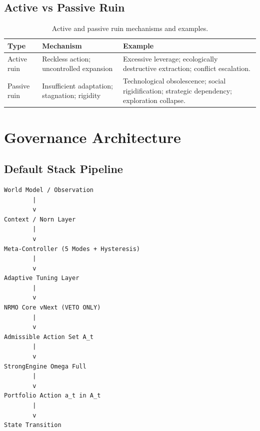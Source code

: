 \subsection{Active vs Passive Ruin}
\label{sec:omega-active-passive-table}

\begin{table}[ht]
\centering
\small
\begin{tabularx}{\linewidth}{lXX}
\toprule
\textbf{Type} & \textbf{Mechanism} & \textbf{Example} \\
\midrule
Active ruin
& Reckless action; uncontrolled expansion
& Excessive leverage; ecologically destructive extraction; conflict
escalation. \\

Passive ruin
& Insufficient adaptation; stagnation; rigidity
& Technological obsolescence; social rigidification; strategic
dependency; exploration collapse. \\

\bottomrule
\end{tabularx}
\caption[Active vs passive ruin]{Active and passive ruin mechanisms
and examples.}
\label{tab:omega-active-passive}
\end{table}

\section{Governance Architecture}
\label{sec:omega-governance-arch}


\subsection{Default Stack Pipeline}
\label{sec:omega-default-stack}

\begin{lstlisting}[basicstyle=\ttfamily\scriptsize,frame=single]
World Model / Observation
        |
        v
Context / Norn Layer
        |
        v
Meta-Controller (5 Modes + Hysteresis)
        |
        v
Adaptive Tuning Layer
        |
        v
NRMO Core vNext (VETO ONLY)
        |
        v
Admissible Action Set A_t
        |
        v
StrongEngine Omega Full
        |
        v
Portfolio Action a_t in A_t
        |
        v
State Transition
\end{lstlisting}

